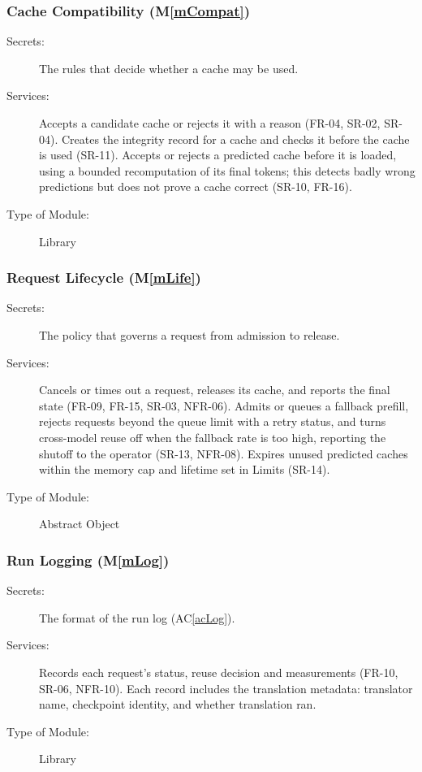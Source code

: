 \documentclass[12pt, titlepage]{article}
\newcommand{\acref}[1]{AC\ref{#1}}
\newcommand{\mref}[1]{M\ref{#1}}
\begin{document}
\subsubsection{Cache Compatibility (\mref{mCompat})}

\begin{description}
\item[Secrets:] The rules that decide whether a cache may be used.
\item[Services:] Accepts a candidate cache or rejects it with a reason (FR-04,
  SR-02, SR-04). Creates the integrity record for a cache and checks it before
  the cache is used (SR-11). Accepts or rejects a predicted cache before it is
  loaded, using a bounded recomputation of its final tokens; this detects badly
  wrong predictions but does not prove a cache correct (SR-10, FR-16).
\item[Type of Module:] Library
\end{description}

\subsubsection{Request Lifecycle (\mref{mLife})}

\begin{description}
\item[Secrets:] The policy that governs a request from admission to release.
\item[Services:] Cancels or times out a request, releases its cache, and
  reports the final state (FR-09, FR-15, SR-03, NFR-06). Admits or queues a
  fallback prefill, rejects requests beyond the queue limit with a retry status,
  and turns cross-model reuse off when the fallback rate is too high, reporting
  the shutoff to the operator (SR-13, NFR-08). Expires unused predicted caches
  within the memory cap and lifetime set in Limits (SR-14).
\item[Type of Module:] Abstract Object
\end{description}

\subsubsection{Run Logging (\mref{mLog})}

\begin{description}
\item[Secrets:] The format of the run log (\acref{acLog}).
\item[Services:] Records each request's status, reuse decision and measurements
  (FR-10, SR-06, NFR-10). Each record includes the translation metadata:
  translator name, checkpoint identity, and whether translation ran.
\item[Type of Module:] Library
\end{description}
\end{document}

